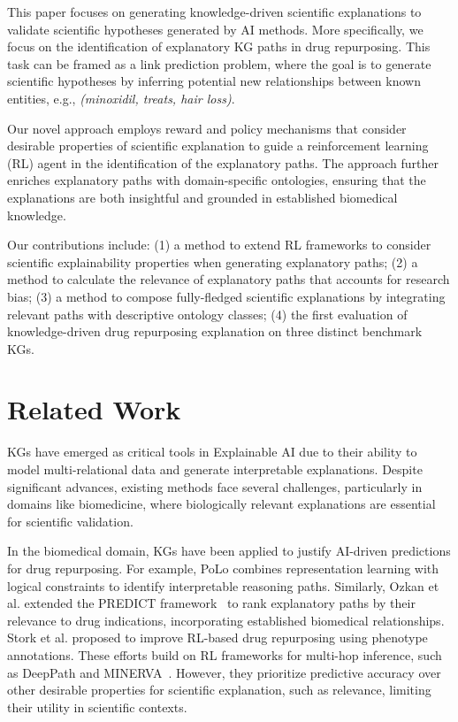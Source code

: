 \documentclass{article}
\theoremstyle{definition}
\begin{document}
This paper focuses on generating knowledge-driven scientific explanations to validate scientific hypotheses generated by AI methods. More specifically, we focus on the identification of explanatory KG paths in drug repurposing. This task can be framed as a link prediction problem, where the goal is to generate scientific hypotheses by inferring potential new relationships between known entities, e.g., \textit{(minoxidil, treats, hair loss)}.

Our novel approach employs reward and policy mechanisms that consider desirable properties of scientific explanation to guide a reinforcement learning (RL) agent in the identification of the explanatory paths. The approach further enriches explanatory paths with domain-specific ontologies, ensuring that the explanations are both insightful and grounded in established biomedical knowledge.

Our contributions include: (1) a method to extend RL frameworks to consider scientific explainability properties when generating explanatory paths; (2) a method to calculate the relevance of explanatory paths that accounts for research bias; (3) a method to compose fully-fledged scientific explanations by integrating relevant paths with descriptive ontology classes; (4) the first evaluation of knowledge-driven drug repurposing explanation on three distinct benchmark KGs.

\section{Related Work}
KGs have emerged as critical tools in Explainable AI due to their ability to model multi-relational data and generate interpretable explanations. Despite significant advances, existing methods face several challenges, particularly in domains like biomedicine, where biologically relevant explanations are essential for scientific validation.

In the biomedical domain, KGs have been applied to justify AI-driven predictions for drug repurposing. For example, PoLo \cite{liu2021neural} combines representation learning with logical constraints to identify interpretable reasoning paths. Similarly, Ozkan et al. \cite{ozkan2023generating} extended the PREDICT framework~\cite{gottlieb2011predict} to rank explanatory paths by their relevance to drug indications, incorporating established biomedical relationships. Stork et al. \cite{stork2023explainable} proposed to improve RL-based drug repurposing using phenotype annotations. These efforts build on RL frameworks for multi-hop inference, such as DeepPath \cite{xiong2017deeppath} and MINERVA~\cite{das2017minerva}. However, they prioritize predictive accuracy over other desirable properties for scientific explanation, such as relevance, limiting their utility in scientific contexts.
\end{document}
